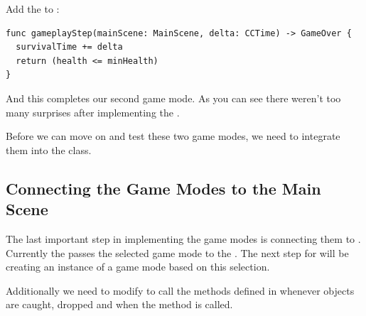 \begin{leftbar}
Add the  to :
\begin{lstlisting}
func gameplayStep(mainScene: MainScene, delta: CCTime) -> GameOver {
  survivalTime += delta
  return (health <= minHealth)
}
\end{lstlisting}
\end{leftbar}
And this completes our second game mode. As you can see there weren't too many
surprises after implementing the .

Before we can move on and test these two game modes, we need to
integrate them into the  class.

\subsection{Connecting the Game Modes to the Main Scene}
The last important step in implementing the game modes is connecting them to
. Currently the  passes the
selected game mode to the . The next step for 
 will be creating an instance of a game mode based on this
selection.

Additionally we need to modify  to call the methods
defined in  whenever objects are caught, dropped
and when the  method is called.

